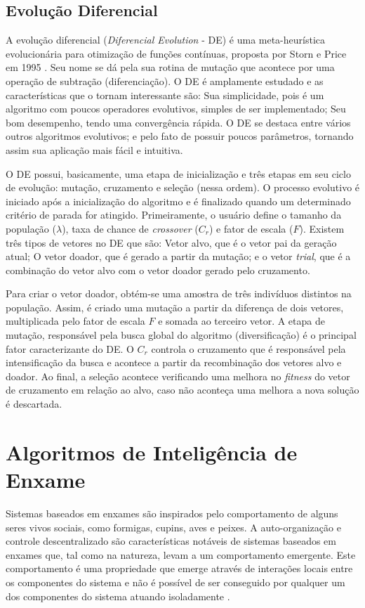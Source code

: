 \subsection{Evolução Diferencial}
\label{sec:diferencial_evolution}
A evolução diferencial (\textit{Diferencial Evolution} - DE) é uma meta-heurística evolucionária para otimização de funções contínuas, proposta por Storn e Price em 1995 \cite{de}. Seu nome se dá pela sua rotina de mutação que acontece por uma operação de subtração (diferenciação). O DE é amplamente estudado e as características que o tornam interessante são: Sua simplicidade, pois é um algoritmo com poucos operadores evolutivos, simples de ser implementado; Seu bom desempenho, tendo uma convergência rápida. O DE se destaca entre vários outros algoritmos evolutivos; e pelo fato de possuir poucos parâmetros, tornando assim sua aplicação mais fácil e intuitiva.

O DE possui, basicamente, uma etapa de inicialização e três etapas em seu ciclo de evolução: mutação, cruzamento e seleção (nessa ordem). O processo evolutivo é iniciado após a inicialização do algoritmo e é finalizado quando um determinado critério de parada for atingido. Primeiramente, o usuário define o tamanho da população ($\lambda$), taxa de chance de \textit{crossover} ($C_r$) e fator de escala ($F$). Existem três tipos de vetores no DE que são: Vetor alvo, que é o vetor pai da geração atual; O vetor doador, que é gerado a partir da mutação; e o vetor \textit{trial}, que é a combinação do vetor alvo com o vetor doador gerado pelo cruzamento.

Para criar o vetor doador, obtém-se uma amostra de três indivíduos distintos na população. Assim, é criado uma mutação a partir da diferença de dois vetores, multiplicada pelo fator de escala $F$ e somada ao terceiro vetor. A etapa de mutação, responsável pela busca global do algoritmo (diversificação) é o principal fator caracterizante do DE. O $C_r$ controla o cruzamento que é responsável pela intensificação da busca e acontece a partir da recombinação dos vetores alvo e doador. Ao final, a seleção acontece verificando uma melhora no \textit{fitness} do vetor de cruzamento em relação ao alvo, caso não aconteça uma melhora a nova solução é descartada.

\section{Algoritmos de Inteligência de Enxame}
\label{sec:swarm_intelligence_algorithms}
Sistemas baseados em enxames são inspirados pelo comportamento de alguns seres vivos sociais, como formigas, cupins, aves e peixes. A auto-organização e controle descentralizado são características notáveis de sistemas baseados em enxames que, tal como na natureza, levam a um comportamento emergente. Este comportamento é uma propriedade que emerge através de interações locais entre os componentes do sistema e não é possível de ser conseguido por qualquer um dos componentes do sistema atuando isoladamente \cite{garnier2007biological}.

